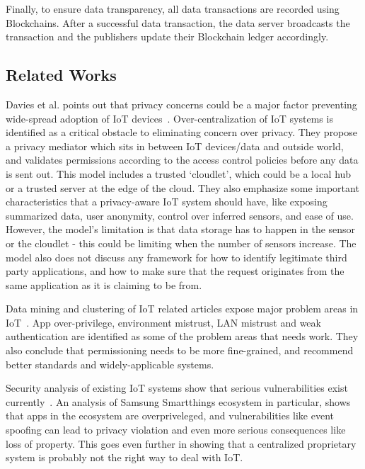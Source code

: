 Finally, to ensure data transparency, all data transactions are recorded using Blockchains. After a successful data transaction, the data server broadcasts the transaction and the publishers update their Blockchain ledger accordingly. 

\subsection{Related Works}
Davies et al. points out that privacy concerns could be a major factor preventing wide-spread adoption of IoT devices~\cite{davies}. Over-centralization of IoT systems is identified as a critical obstacle to eliminating concern over privacy. They propose a privacy mediator which sits in between IoT devices/data and outside world, and validates permissions according to the access control policies before any data is sent out. This model includes a trusted `cloudlet', which could be a local hub or a trusted server at the edge of the cloud. They also emphasize some important characteristics that a privacy-aware IoT system should have, like exposing summarized data, user anonymity, control over inferred sensors, and ease of use. However, the model's limitation is that data storage has to happen in the sensor or the cloudlet - this could be limiting when the number of sensors increase. The model also does not discuss any framework for how to identify legitimate third party applications, and how to make sure that the request originates from the same application as it is claiming to be from.

Data mining and clustering of IoT related articles expose major problem areas in IoT~\cite{zhang}. App over-privilege, environment mistrust, LAN mistrust and weak authentication are identified as some of the problem areas that needs work. They also conclude that permissioning needs to be more fine-grained, and recommend better standards and widely-applicable systems.

Security analysis of existing IoT systems show that serious vulnerabilities exist currently~\cite{smartthings}. An analysis of Samsung Smartthings ecosystem in particular, shows that apps in the ecosystem are overpriveleged, and vulnerabilities like event spoofing can lead to privacy violation and even more serious consequences like loss of property. This goes even further in showing that a centralized proprietary system is probably not the right way to deal with IoT.

